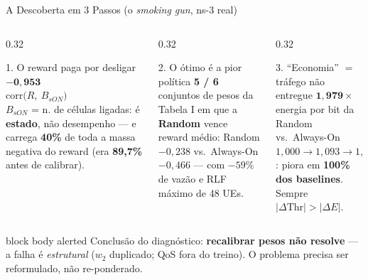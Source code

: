 \documentclass[aspectratio=169,10pt,xcolor={dvipsnames,table}]{beamer}
\begin{document}
\begin{frame}{A Descoberta em 3 Passos (o \emph{smoking gun}, ns-3 real)}
  \begin{columns}[T]
    \begin{column}{0.32\textwidth}
      \begin{block}{1. O reward paga por desligar}
        \centering
        {\LARGE $\mathbf{-0{,}953}$}\\[1mm]
        {\scriptsize $\mathrm{corr}\big(R,\ B_{sON}\big)$}\\[2mm]
        {\scriptsize $B_{sON}$ = n.\textdegree{} de c\'elulas ligadas: \'e
        \textbf{estado}, n\~ao desempenho --- e carrega \textbf{40\%} de toda a
        massa negativa do reward (era \textbf{89,7\%} antes de calibrar).}
      \end{block}
    \end{column}
    \begin{column}{0.32\textwidth}
      \begin{alertblock}{2. O \'otimo \'e a pior pol\'itica}
        \centering
        {\LARGE \textbf{5 / 6}}\\[1mm]
        {\scriptsize conjuntos de pesos da Tabela I em que a \textbf{Random}
        vence}\\[2mm]
        {\scriptsize reward m\'edio: Random $-0{,}238$ vs.\ Always-On $-0{,}466$
        --- com $-59\%$ de vaz\~ao e RLF m\'aximo de 48 UEs.}
      \end{alertblock}
    \end{column}
    \begin{column}{0.32\textwidth}
      \begin{block}{3. ``Economia'' $=$ tr\'afego n\~ao entregue}
        \centering
        {\LARGE $\mathbf{1{,}979}\times$}\\[1mm]
        {\scriptsize energia por bit da Random vs.\ Always-On}\\[2mm]
        {\scriptsize $1{,}000 \to 1{,}093 \to 1{,}148 \to \mathbf{1{,}979}$:
        piora em \textbf{100\% dos baselines}. Sempre $\lvert\Delta
        \text{Thr}\rvert > \lvert\Delta E\rvert$.}
      \end{block}
    \end{column}
  \end{columns}
  \vspace{2mm}
  \begin{beamercolorbox}[wd=\textwidth,sep=2pt]{block body alerted}
    \centering\small
    Conclus\~ao do diagn\'ostico: \textbf{recalibrar pesos n\~ao resolve} --- a
    falha \'e \emph{estrutural} ($w_2$ duplicado; QoS fora do treino). O problema
    precisa ser reformulado, n\~ao re-ponderado.
  \end{beamercolorbox}
\end{frame}
\end{document}
